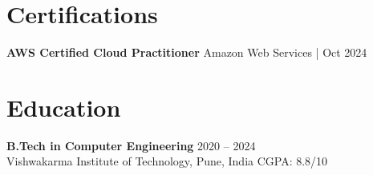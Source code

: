 \documentclass[a4paper,10pt]{article}
\begin{document}
\section*{Certifications}
\textbf{AWS Certified Cloud Practitioner} \hfill Amazon Web Services \;|\; Oct 2024

\section*{Education}
\textbf{B.Tech in Computer Engineering} \hfill 2020 -- 2024 \\
Vishwakarma Institute of Technology, Pune, India \hfill CGPA: 8.8/10
\end{document}
